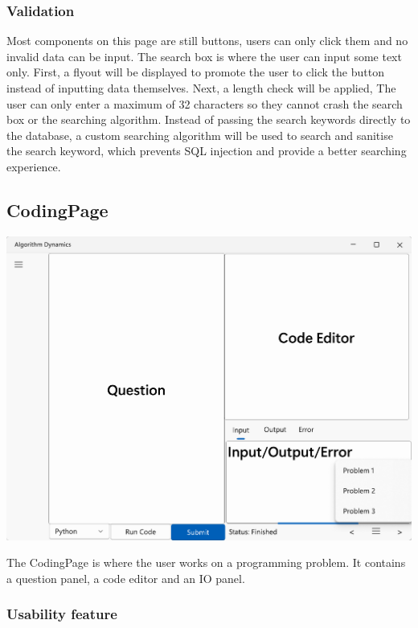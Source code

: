 \documentclass[a4paper]{report}
\begin{document}
\subsubsection{Validation}

Most components on this page are still buttons, users can only click them and no invalid data can be input. The search box is where the user can input some text only. First, a flyout will be displayed to promote the user to click the button instead of inputting data themselves. Next, a length check will be applied, The user can only enter a maximum of 32 characters so they cannot crash the search box or the searching algorithm. Instead of passing the search keywords directly to the database, a custom searching algorithm will be used to search and sanitise the search keyword, which prevents SQL injection and provide a better searching experience.

\subsection{CodingPage}

\includegraphics[width=\textwidth, height=\textheight, keepaspectratio]{CodingPage-design}

The CodingPage is where the user works on a programming problem. It contains a question panel, a code editor and an IO panel.

\subsubsection{Usability feature}
\end{document}
